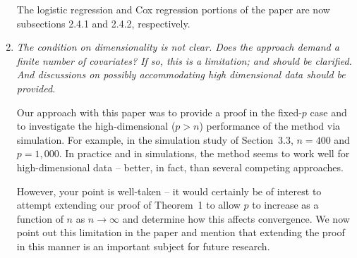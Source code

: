 \documentclass{article}
\begin{document}
\begin{enumerate}
The logistic regression and Cox regression portions of the paper are now subsections 2.4.1 and 2.4.2, respectively.

\item {\em The condition on dimensionality is not clear. Does the approach demand a finite number of covariates? If so, this is a limitation; and should be clarified. And discussions on possibly accommodating high dimensional data should be provided.}

  Our approach with this paper was to provide a proof in the fixed-$p$ case and to investigate the high-dimensional ($p>n$) performance of the method via simulation.  For example, in the simulation study of Section~3.3, $n=400$ and $p=1,000$.  In practice and in simulations, the method seems to work well for high-dimensional data -- better, in fact, than several competing approaches.

  However, your point is well-taken -- it would certainly be of interest to attempt extending our proof of Theorem~1 to allow $p$ to increase as a function of $n$ as $n \to \infty$ and determine how this affects convergence.  We now point out this limitation in the paper and mention that extending the proof in this manner is an important subject for future research.

\end{enumerate}

%
%
\end{document}
